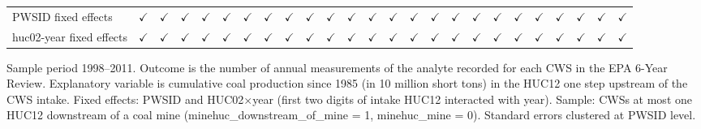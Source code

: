\begin{table}[htbp]
\begin{adjustbox}{width = \textwidth, center}
\begin{tabular}{lcccccccccccccccccccccccc}
         PWSID fixed effects                 & $\checkmark$          & $\checkmark$          & $\checkmark$          & $\checkmark$          & $\checkmark$       & $\checkmark$      & $\checkmark$          & $\checkmark$       & $\checkmark$      & $\checkmark$          & $\checkmark$       & $\checkmark$      & $\checkmark$          & $\checkmark$       & $\checkmark$      & $\checkmark$          & $\checkmark$          & $\checkmark$      & $\checkmark$          & $\checkmark$       & $\checkmark$      & $\checkmark$          & $\checkmark$          & $\checkmark$\\   
         huc02-year fixed effects            & $\checkmark$          & $\checkmark$          & $\checkmark$          & $\checkmark$          & $\checkmark$       & $\checkmark$      & $\checkmark$          & $\checkmark$       & $\checkmark$      & $\checkmark$          & $\checkmark$       & $\checkmark$      & $\checkmark$          & $\checkmark$       & $\checkmark$      & $\checkmark$          & $\checkmark$          & $\checkmark$      & $\checkmark$          & $\checkmark$       & $\checkmark$      & $\checkmark$          & $\checkmark$          & $\checkmark$\\   
         
         \bottomrule
         
      \end{tabular}
      
      
      
   \end{adjustbox}
      {\tiny\linespread{1}\selectfont \par \raggedright 
   Sample period 1998--2011. Outcome is the number of annual measurements of the analyte recorded for each CWS in the EPA 6-Year Review. Explanatory variable is cumulative coal production since 1985 (in 10 million short tons) in the HUC12 one step upstream of the CWS intake. Fixed effects: PWSID and HUC02$\times$year (first two digits of intake HUC12 interacted with year). Sample: CWSs at most one HUC12 downstream of a coal mine (minehuc\_downstream\_of\_mine = 1, minehuc\_mine = 0). Standard errors clustered at PWSID level.}
   
\end{table}


